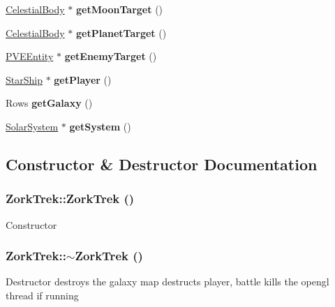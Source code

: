 \begin{DoxyCompactItemize}
\item 
\hypertarget{classZorkTrek_ac8881697c19abeb6b0ccc6e0d154aa95}{
\hyperlink{classCelestialBody}{CelestialBody} $\ast$ {\bfseries getMoonTarget} ()}
\label{d6/df9/classZorkTrek_ac8881697c19abeb6b0ccc6e0d154aa95}

\item 
\hypertarget{classZorkTrek_a95adfa3c24d433be310dfcdacdaaba3e}{
\hyperlink{classCelestialBody}{CelestialBody} $\ast$ {\bfseries getPlanetTarget} ()}
\label{d6/df9/classZorkTrek_a95adfa3c24d433be310dfcdacdaaba3e}

\item 
\hypertarget{classZorkTrek_a453dea1d3772f2c9aec709f143f7ebb2}{
\hyperlink{classPVEEntity}{PVEEntity} $\ast$ {\bfseries getEnemyTarget} ()}
\label{d6/df9/classZorkTrek_a453dea1d3772f2c9aec709f143f7ebb2}

\item 
\hypertarget{classZorkTrek_a117ad54920200cb9953035b6b36a4f31}{
\hyperlink{classStarShip}{StarShip} $\ast$ {\bfseries getPlayer} ()}
\label{d6/df9/classZorkTrek_a117ad54920200cb9953035b6b36a4f31}

\item 
\hypertarget{classZorkTrek_a0ca7f07bb54f16c59216e4d8b6b4ef49}{
Rows {\bfseries getGalaxy} ()}
\label{d6/df9/classZorkTrek_a0ca7f07bb54f16c59216e4d8b6b4ef49}

\item 
\hypertarget{classZorkTrek_aab5f693d6c908e3f2d2545931ae27fd7}{
\hyperlink{classSolarSystem}{SolarSystem} $\ast$ {\bfseries getSystem} ()}
\label{d6/df9/classZorkTrek_aab5f693d6c908e3f2d2545931ae27fd7}

\end{DoxyCompactItemize}


\subsection{Constructor \& Destructor Documentation}
\hypertarget{classZorkTrek_afe7f77cf684870f7264b15431aa9ca9d}{
\subsubsection[{ZorkTrek}]{\setlength{\rightskip}{0pt plus 5cm}ZorkTrek::ZorkTrek ()}}
\label{d6/df9/classZorkTrek_afe7f77cf684870f7264b15431aa9ca9d}
Constructor \hypertarget{classZorkTrek_aea71d65cb3ca6c07ca6c7cc63995e089}{
\subsubsection[{$\sim$ZorkTrek}]{\setlength{\rightskip}{0pt plus 5cm}ZorkTrek::$\sim$ZorkTrek ()}}
\label{d6/df9/classZorkTrek_aea71d65cb3ca6c07ca6c7cc63995e089}
Destructor destroys the galaxy map destructs player, battle kills the opengl thread if running 


